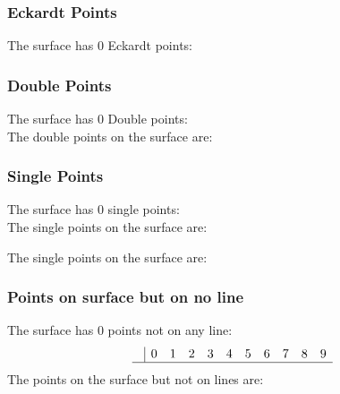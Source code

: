 \documentclass{article}
\begin{document}
{\subsubsection*{Eckardt Points}
The surface has 0 Eckardt points:\\
\subsubsection*{Double Points}
The surface has 0 Double points:\\
The double points on the surface are:\\
\begin{multicols}{2}
\noindent
\end{multicols}
\subsubsection*{Single Points}
The surface has 0 single points:\\
The single points on the surface are:\\
\begin{multicols}{2}
\noindent
\end{multicols}
The single points on the surface are:\\
\subsubsection*{Points on surface but on no line}
The surface has 0 points not on any line:\\
$$
\begin{array}{r|*{10}{r}}
 & 0 & 1 & 2 & 3 & 4 & 5 & 6 & 7 & 8 & 9\\
\hline
\end{array}
$$
The points on the surface but not on lines are:\\
\begin{multicols}{2}
\noindent
\end{multicols}
}
\end{document}
